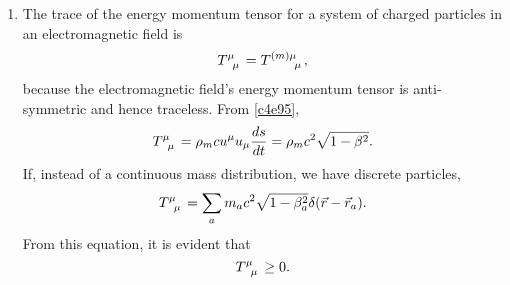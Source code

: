 \begin{enumerate}
\item The trace of the energy momentum tensor for a system of charged particles
in an electromagnetic field is
\begin{equation}\label{c4e106}
\tensor{T}{^\mu_\mu} = \tensor{T}{^{(m)\mu}_\mu},
\end{equation}
because the electromagnetic field's energy momentum tensor is anti-symmetric and
hence traceless. From \eqref{c4e95},
\begin{equation}\label{c4e107}
\tensor{T}{^\mu_\mu} = \rho_m cu^\mu u_\mu \td{s}{t} = 
\rho_m c^2\sqrt{1 - \beta^2}.
\end{equation}
If, instead of a continuous mass distribution, we have discrete particles,
\begin{equation}\label{c4e108}
\tensor{T}{^{\mu}_\mu} = \sum_a m_ac^2\sqrt{1 - \beta_a^2}\delta(\vec{r} - 
\vec{r}_a).
\end{equation}
From this equation, it is evident that
\begin{equation}\label{c4e109}
\tensor{T}{^\mu_\mu} \ge 0.
\end{equation}


\end{enumerate}
